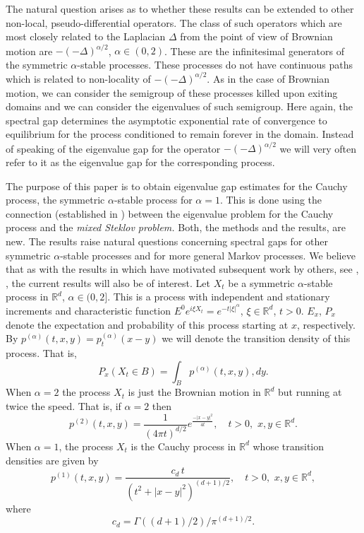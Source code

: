 \documentclass[11pt,leqno]{article}
\theoremstyle{definition}
\newcommand{\Rd}{\mathbb{R}^d}
\numberwithin{equation}{section}
\begin{document}
The natural question arises as to 
 whether these results can
be extended to other  non-local, pseudo-differential operators. The class of such
operators which are most closely related   to the Laplacian $\Delta$ from the point of view of
Brownian motion are $-(-\Delta)^{\alpha/2}$, $\alpha \in
(0,2)$.  These are   the infinitesimal
generators of the symmetric $\alpha$-stable processes.  
 These processes do not have continuous paths which is related
to non-locality of $-(-\Delta)^{\alpha/2}$. As in the case of Brownian
motion, we can consider the semigroup of these 
processes killed upon exiting domains and we can consider the eigenvalues 
 of such semigroup. Here again, the spectral gap
determines the asymptotic exponential rate of convergence to
equilibrium for the process conditioned to remain forever in the domain. 
Instead of speaking of
the eigenvalue gap for the operator  $-(-\Delta)^{\alpha/2}$ 
we will very often refer
to it as the eigenvalue gap for the corresponding process. 

The purpose of this paper is to obtain  eigenvalue gap estimates for the Cauchy
process, the symmetric $\alpha$-stable process for $\alpha
=1$. This is done using the connection (established in \cite{BK})
between the eigenvalue problem for the Cauchy process and 
 the {\it mixed Steklov problem.} Both, the  methods and the  results,
are new.  The results raise natural questions
concerning  spectral gaps for other
symmetric
$\alpha$-stable processes and for more general  Markov processes.  We  believe that
as with the results in \cite{BK} which have motivated subsequent work by others, 
see \cite {Bl2}, \cite{DeMe} \cite{CS3}, the current results will also be of interest.   
Let $X_t$ be a symmetric $\alpha$-stable process in $\Rd$, $\alpha \in
(0,2]$. This is a process with independent and stationary increments
and characteristic function 
$E^0 e^{i \xi X_t} = e^{-t |\xi|^{\alpha}}$, $\xi \in \Rd$, $ t > 0$. 
$E_x$, $P_x$ denote the expectation and probability of this process
starting at $x$, respectively.  By $p^{(\alpha)}(t,x,y) = p_t^{(\alpha)}(x-y)$ we
will denote the transition density of this process. That is, 
$$P_{x}(X_t \in
B)= \int_{B}p^{(\alpha)}(t,x,y), dy.
$$
When $\alpha = 2$ the process $X_t$ is just the Brownian motion in $\Rd$ but running at twice the speed.
That is, if $\alpha = 2$ then
\begin{equation}
\label{gaussian}
p^{(2)}(t,x,y) = \frac{1}{(4 \pi t)^{d/2}} e^{\frac{-|x-y|^2}{4t}},\quad t > 0, \, \, x,y \in \Rd.
\end{equation}
When $\alpha = 1$, the process $X_t$ is the Cauchy process in $\Rd$ whose transition densities are given
by
\begin{equation}
\label{transition}
p^{(1)}(t,x,y) = \frac{c_d \, t}{(t^2 + |x - y|^2)^{(d + 1)/2}}, \quad t > 0, \, \, x,y \in \Rd,
\end{equation}
where
$$
c_d = \Gamma((d+1)/2)/ \pi^{(d+1)/2}.
$$
\end{document}
